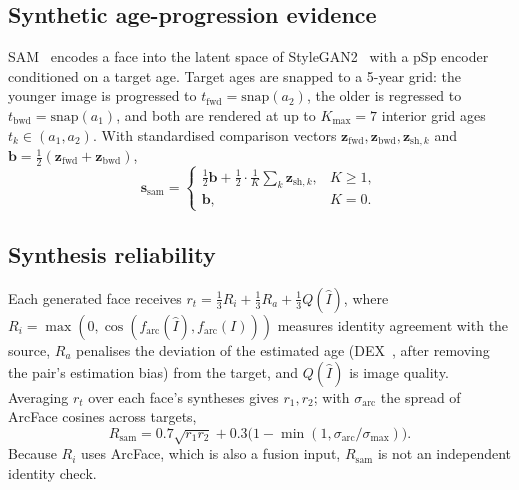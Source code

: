 \documentclass[journal]{IEEEtran}
\begin{document}
\subsection{Synthetic age-progression evidence}
SAM~\cite{alaluf2021sam} encodes a face into the latent space of StyleGAN2~\cite{karras2020stylegan2} with a pSp encoder~\cite{richardson2021psp} conditioned on a target age. Target ages are snapped to a 5-year grid: the younger image is progressed to $t_\mathrm{fwd}=\mathrm{snap}(a_2)$, the older is regressed to $t_\mathrm{bwd}=\mathrm{snap}(a_1)$, and both are rendered at up to $K_\mathrm{max}=7$ interior grid ages $t_k\in(a_1,a_2)$. With standardised comparison vectors $\mathbf z_\mathrm{fwd},\mathbf z_\mathrm{bwd},\mathbf z_{\mathrm{sh},k}$ and $\mathbf b=\tfrac12(\mathbf z_\mathrm{fwd}+\mathbf z_\mathrm{bwd})$,
\begin{equation}
\mathbf s_\mathrm{sam}=\begin{cases}\tfrac12\mathbf b+\tfrac12\cdot\tfrac{1}{K}\sum_k\mathbf z_{\mathrm{sh},k}, & K\ge1,\\ \mathbf b, & K=0.\end{cases}
\end{equation}

\subsection{Synthesis reliability}
Each generated face receives $r_t=\tfrac13 R_i+\tfrac13 R_a+\tfrac13 Q(\hat I)$, where $R_i=\max(0,\cos(f_\mathrm{arc}(\hat I),f_\mathrm{arc}(I)))$ measures identity agreement with the source, $R_a$ penalises the deviation of the estimated age (DEX~\cite{rothe2018dex}, after removing the pair's estimation bias) from the target, and $Q(\hat I)$ is image quality. Averaging $r_t$ over each face's syntheses gives $r_1,r_2$; with $\sigma_\mathrm{arc}$ the spread of ArcFace cosines across targets,
\begin{equation}
R_\mathrm{sam}=0.7\sqrt{r_1r_2}+0.3\big(1-\min(1,\sigma_\mathrm{arc}/\sigma_\mathrm{max})\big).
\end{equation}
Because $R_i$ uses ArcFace, which is also a fusion input, $R_\mathrm{sam}$ is not an independent identity check.
\end{document}

